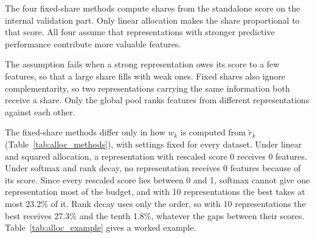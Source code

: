 


The four fixed-share methods compute shares from the standalone score on the internal validation part. Only linear allocation makes the share proportional to that score. All four assume that representations with stronger predictive performance contribute more valuable features.




The assumption fails when a strong representation owes its score to a few features, so that a large share fills with weak ones. Fixed shares also ignore complementarity, so two representations carrying the same information both receive a share. Only the global pool ranks features from different representations against each other.


The fixed-share methods differ only in how $w_k$ is computed from $\tilde r_k$ (Table~\ref{tab:alloc_methods}), with settings fixed for every dataset. Under linear and squared allocation, a representation with rescaled score 0 receives 0 features. Under softmax and rank decay, no representation receives 0 features because of its score. Since every rescaled score lies between 0 and 1, softmax cannot give one representation most of the budget, and with 10 representations the best takes at most 23.2\% of it. Rank decay uses only the order, so with 10 representations the best receives 27.3\% and the tenth 1.8\%, whatever the gaps between their scores. Table~\ref{tab:alloc_example} gives a worked example.

